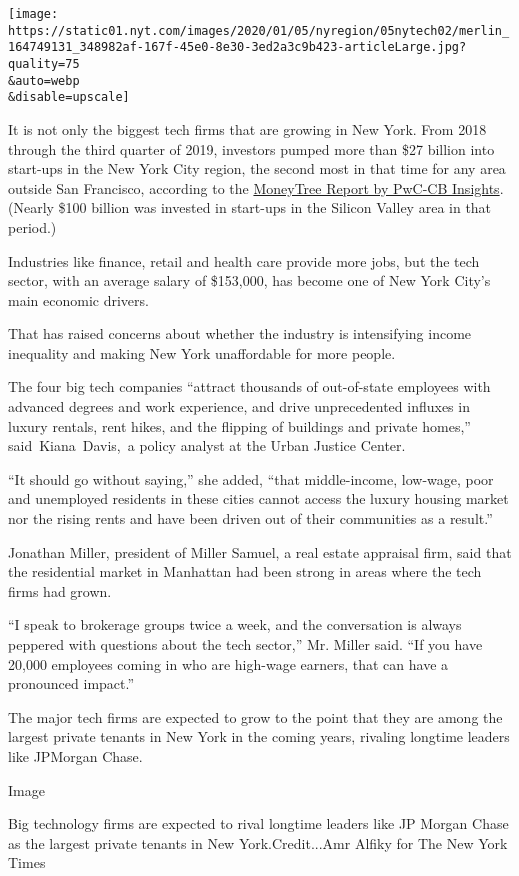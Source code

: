 \texttt{[image: https://static01.nyt.com/images/2020/01/05/nyregion/05nytech02/merlin\_164749131\_348982af-167f-45e0-8e30-3ed2a3c9b423-articleLarge.jpg?quality=75\\\&auto=webp\\\&disable=upscale]}

It is not only the biggest tech firms that are growing in New York. From
2018 through the third quarter of 2019, investors pumped more than \$27
billion into start-ups in the New York City region, the second most in
that time for any area outside San Francisco, according to the
\href{https://www.pwc.com/us/en/moneytree-report/assets/moneytree-report-q3-2019.pdf}{MoneyTree
Report by PwC-CB Insights}. (Nearly \$100 billion was invested in
start-ups in the Silicon Valley area in that period.)

Industries like finance, retail and health care provide more jobs, but
the tech sector, with an average salary of \$153,000, has become one of
New York City's main economic drivers.

That has raised concerns about whether the industry is intensifying
income inequality and making New York unaffordable for more people.

The four big tech companies ``attract thousands of out-of-state
employees with advanced degrees and work experience, and drive
unprecedented influxes in luxury rentals, rent hikes, and the flipping
of buildings and private homes,'' said~Kiana~Davis,~a policy analyst at
the Urban Justice Center.

``It should go without saying,'' she added, ``that middle-income,
low-wage, poor and unemployed residents in these cities cannot access
the luxury housing market nor the rising rents and have been driven out
of their communities as a result.''

Jonathan Miller, president of Miller Samuel, a real estate appraisal
firm, said that the residential market in Manhattan had been strong in
areas where the tech firms had grown.

``I speak to brokerage groups twice a week, and the conversation is
always peppered with questions about the tech sector,'' Mr. Miller said.
``If you have 20,000 employees coming in who are high-wage earners, that
can have a pronounced impact.''

The major tech firms are expected to grow to the point that they are
among the largest private tenants in New York in the coming years,
rivaling longtime leaders like JPMorgan Chase.

Image

Big technology firms are expected to rival longtime leaders like JP
Morgan Chase as the largest private tenants in New York.Credit...Amr
Alfiky for The New York Times

